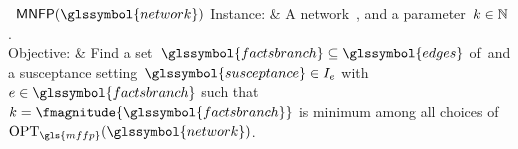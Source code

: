 \begin{problem}[framed]{\MNFP~$\mnfp(\glssymbol{network})$}%
    Instance:  & A network~, and a
    parameter~$k\in\mathbb{N}$.\\
    Objective: & Find a set~$\glssymbol{factsbranch}\subseteq\glssymbol{edges}$
    of~\facts and a susceptance
    setting~$\glssymbol{susceptance}\in\interval_{\edge}$
    with~$\edge\in\glssymbol{factsbranch}$ such that~$k =
    \fmagnitude{\glssymbol{factsbranch}}$ is minimum among all choices
    of~$\opt_{\gls{mffp}}(\glssymbol{network})$.
\end{problem}%